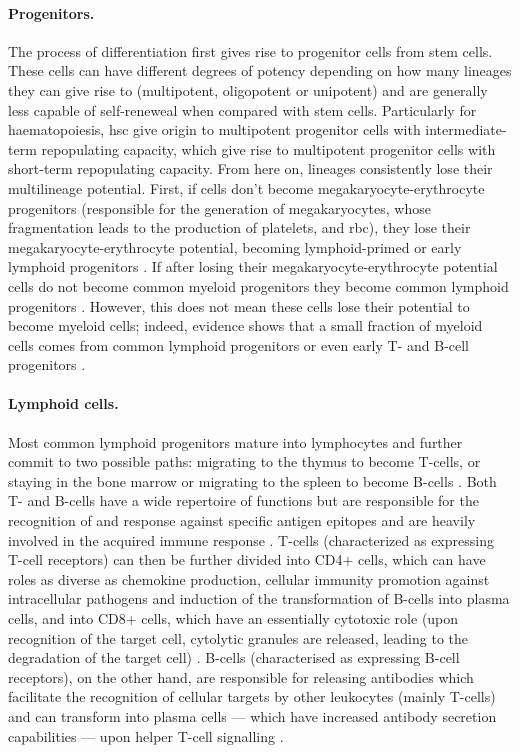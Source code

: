 \paragraph{Progenitors.} The process of differentiation first gives rise to progenitor cells from stem cells. These cells can have different degrees of potency depending on how many lineages they can give rise to (multipotent, oligopotent or unipotent) and are generally less capable of self-reneweal when compared with stem cells. Particularly for haematopoiesis, \ac{hsc} give origin to multipotent progenitor cells with intermediate-term repopulating capacity, which give rise to multipotent progenitor cells with short-term repopulating capacity. From here on, lineages consistently lose their multilineage potential. First, if cells don't become megakaryocyte-erythrocyte progenitors (responsible for the generation of megakaryocytes, whose fragmentation leads to the production of platelets, and \ac{rbc}), they lose their megakaryocyte-erythrocyte potential, becoming lymphoid-primed or early lymphoid progenitors \cite{Adolfsson2005-iq}. If after losing their megakaryocyte-erythrocyte potential cells do not become common myeloid progenitors they become common lymphoid progenitors \cite{Kondo1997-fb}. However, this does not mean these cells lose their potential to become myeloid cells; indeed, evidence shows that a small fraction of myeloid cells comes from common lymphoid progenitors or even early T- and B-cell progenitors \cite{Schlenner2010-ga,Kawamoto2010-yp}. 

\paragraph{Lymphoid cells.} Most common lymphoid progenitors mature into lymphocytes and further commit to two possible paths: migrating to the thymus to become T-cells, or staying in the bone marrow or migrating to the spleen to become B-cells \cite{Inlay2009-as}. Both T- and B-cells have a wide repertoire of functions but are responsible for the recognition of and response against specific antigen epitopes and are heavily involved in the acquired immune response \cite{Cano2013-gu}. T-cells (characterized as expressing T-cell receptors) can then be further divided into CD4+ cells, which can have roles as diverse as chemokine production, cellular immunity promotion against intracellular pathogens and induction of the transformation of B-cells into plasma cells, and into CD8+ cells, which have an essentially cytotoxic role (upon recognition of the target cell, cytolytic granules are released, leading to the degradation of the target cell) \cite{Cano2013-gu}. B-cells (characterised as expressing B-cell receptors), on the other hand, are responsible for releasing antibodies which facilitate the recognition of cellular targets by other leukocytes (mainly T-cells) and can transform into plasma cells --- which have increased antibody secretion capabilities --- upon helper T-cell signalling \cite{Cano2013-gu,Janeway2001-mb}. 


